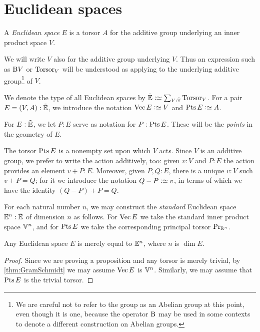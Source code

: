 \section{Euclidean spaces}

\begin{definition}\label{def:EuclideanSpace}
  A {\em Euclidean space} $E$ is a torsor $A$ for the additive group
  underlying an inner product space $V$.
\end{definition}

We will write $V$ also for the additive group underlying $V$.  Thus an
expression such as $\mathrm{B} V$ or $\mathrm{Torsor}_V$ will be understood as applying to
the underlying additive group\footnote{We are careful not to refer to the group
  as an Abelian group at this point, even though it is one, because the
  operator $\mathrm{B}$ may be used in some contexts to denote a different construction
  on Abelian groups.}
of $V$.

We denote the type of all Euclidean spaces by $\ES \defeq \sum_{V:\OS} \typetorsor_V$.
For a pair $E = (V,A) : {\tilde {\mathbb E}}$, we introduce the notation $\Vectors E \defeq V$ and $\Points E \defeq A$.

For $E:{\tilde {\mathbb E}}$, we let $P:E$ serve as notation for $P:\Points E$.  These will be
the {\em points} in the geometry of $E$.

The torsor $\Points E$ is a nonempty set upon which $V$ acts.  Since $V$ is an
additive group, we prefer to write the action additively, too: given $v:V$ and
$P:E$ the action provides an element $v+P:E$.  Moreover, given $P,Q:E$, there
is a unique $v:V$ such $v+P = Q$; for it we introduce the notation $Q-P \defeq
v$, in terms of which we have the identity $(Q-P)+P=Q$.

For each natural number $n$, we may construct the {\em standard} Euclidean
space $\mathbb E^n : {\tilde {\mathbb E}}$ of dimension $n$ as follows.  For $\Vectors E$ we take the
standard inner product space $\mathbb V^n$, and for $\Points E$ we take the
corresponding principal torsor $\mathrm{Pr}_{{\mathbb{R}^n}}$.

\begin{theorem}\label{thm:EuclideanNormalization}
  Any Euclidean space $E$ is merely equal to $\mathbb E^n$, where $n$ is $\dim E$.
\end{theorem}

\begin{proof}
  Since we are proving a proposition and any torsor is merely trivial, by
  \cref{thm:GramSchmidt} we may assume $\Vectors E$ is $\mathbb V^n$.  Similarly, we
  may assume that $\Points E$ is the trivial torsor.
\end{proof}

